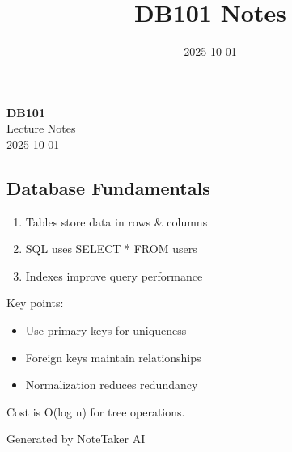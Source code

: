 \documentclass[11pt,a4paper]{article}
\title{\textcolor{primarycolor}{\Huge\textbf{DB101 Notes}}}
\author{}
\date{\textcolor{secondarycolor}{2025-10-01}}
\begin{document}
\begin{center}
    \colorbox{secondarycolor!10}{%
        \parbox{0.95\textwidth}{%
            \centering
            \vspace{0.5cm}
            {\Huge\textcolor{primarycolor}{\textbf{DB101}}} \\[0.5cm]
            {\Large Lecture Notes} \\[0.3cm]
            {\large\textcolor{secondarycolor}{2025-10-01}}
            \vspace{0.5cm}
        }
    }
\end{center}

\vspace{1cm}

\subsection*{Database Fundamentals}

\begin{enumerate}
  \item Tables store data in rows \& columns
  \item SQL uses SELECT * FROM users
  \item Indexes improve query performance
\end{enumerate}

Key points:
\begin{itemize}
  \item Use primary keys for uniqueness
  \item Foreign keys maintain relationships
  \item Normalization reduces redundancy
\end{itemize}

Cost is O(log n) for tree operations.

\vspace{1cm}

\begin{center}
\textcolor{secondarycolor}{\small Generated by NoteTaker AI}
\end{center}
\end{document}
